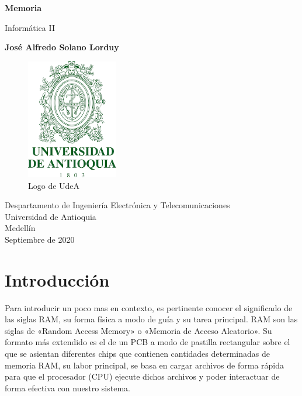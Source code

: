 \documentclass{article}
\begin{document}
\begin{titlepage}
    \begin{center}
        \vspace*{0.5cm}
            
        \Huge
        \textbf{Memoria}
            
        \vspace{0.5cm}
        \LARGE
        Informática II
            
        \vspace{1.5cm}
            
        \textbf{José Alfredo Solano Lorduy}
        
        \vspace{2.5cm}
        
        \begin{figure}[h]
\includegraphics[width=4cm]{Udea.png}
\centering
\caption{Logo de UdeA}
\label{fig:udealogo}
\end{figure}
            
        \vfill
            
        \vspace{0.8cm}
            
        \Large
        Despartamento de Ingeniería Electrónica y Telecomunicaciones\\
        Universidad de Antioquia\\
        Medellín\\
        Septiembre de 2020
            
    \end{center}
\end{titlepage}

\tableofcontents

\section{Introducción}
Para introducir un poco mas en contexto, es pertinente conocer el significado de las siglas RAM, su forma física a modo de guía y su tarea principal. RAM son las siglas de «Random Access Memory» o «Memoria de Acceso Aleatorio». Su formato más extendido es el de un PCB a modo de pastilla rectangular sobre el que se asientan diferentes chips que contienen cantidades determinadas de memoria RAM, su labor principal, se basa en cargar archivos de forma rápida para que el procesador (CPU) ejecute dichos archivos y poder interactuar de forma efectiva con nuestro sistema.\cite{muycomputer}
\end{document}
